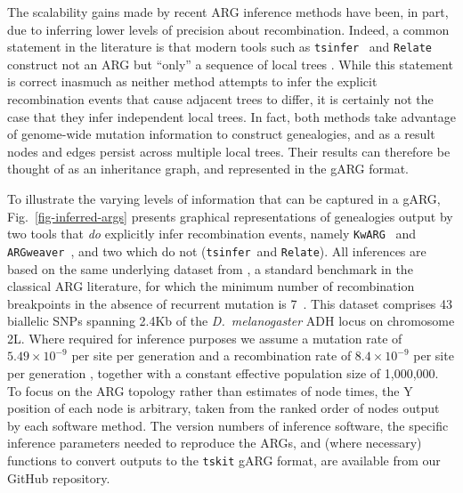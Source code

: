 \documentclass{article}
\newcommand{\tsinfer}[0]{\texttt{tsinfer}}
\newcommand{\kwarg}[0]{\texttt{KwARG}}
\newcommand{\argweaver}[0]{\texttt{ARGweaver}}
\newcommand{\relate}[0]{\texttt{Relate}}
\begin{document}
The scalability gains made by recent ARG inference methods have been, in part, due to inferring
lower levels of precision about recombination. Indeed, a common statement in the literature is
that modern tools such as \tsinfer~\citep{kelleher2019inferring} and \relate~\citep{speidel2019method}
construct not an ARG but ``only'' a sequence of local
trees \citep[e.g.][]{hejase2020summary, brandt2021evaluation, ignatieva2021kwarg}. While this statement
is correct inasmuch as neither method attempts to infer the explicit recombination events that cause
adjacent trees to differ, it is certainly not the case that they infer independent local trees.
In fact, both methods take advantage of genome-wide mutation information to construct genealogies,
and as a result nodes and edges persist across multiple local trees.
Their results can therefore be thought of as an inheritance graph, and represented in the gARG format.

To illustrate the varying levels of information that can be captured in a gARG,
Fig.~\ref{fig-inferred-args} presents graphical representations of genealogies output by two tools that
\emph{do} explicitly infer recombination events, namely \kwarg~\citep{ignatieva2021kwarg} and
\argweaver~\citep{rasmussen2014genome},
and two which do not (\tsinfer\ and \relate).
All inferences are based on the
same underlying dataset from \citet{kreitman1983nucleotide}, a standard benchmark in the classical
ARG literature, for which the minimum number of recombination breakpoints in the absence of recurrent
mutation is 7~\citep{song2003parsimonious}. This dataset comprises 43 biallelic SNPs spanning 2.4Kb of the
\emph{D.~melanogaster} ADH locus on chromosome 2L. Where required for inference purposes we
assume a mutation rate of
$5.49\times10^{-9}$ per site per generation
and a recombination rate of
$8.4\times10^{-9}$ per site per generation
\citep{adrion2020community,lauterbur2022expanding},
together with
a constant effective population size of 1,000,000.
To focus on the ARG topology rather than estimates of node times, the Y position of each node
is arbitrary, taken from the ranked order of nodes output by each software method.
The version numbers of inference software, the specific inference parameters
needed to reproduce the ARGs, and (where necessary) functions to convert outputs to the
\texttt{tskit} gARG format, are available from our GitHub repository.
\end{document}
